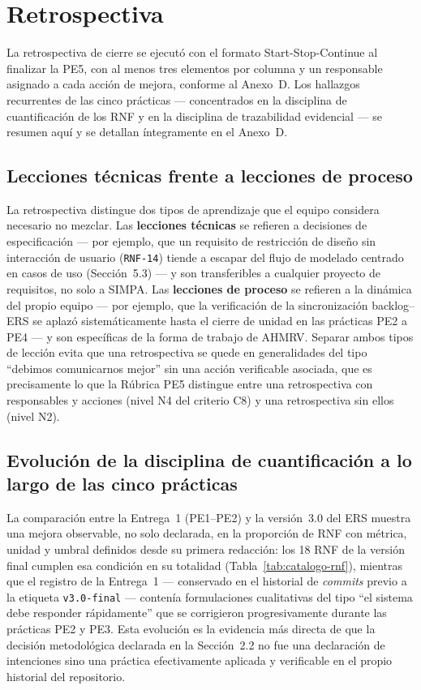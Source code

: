 \documentclass[11pt,a4paper]{article}
\newcommand{\id}[1]{\texttt{#1}}
\begin{document}
\section{Retrospectiva}

La retrospectiva de cierre se ejecutó con el formato Start-Stop-Continue al finalizar la PE5, con
al menos tres elementos por columna y un responsable asignado a cada acción de mejora, conforme al
Anexo~D. Los hallazgos recurrentes de las cinco prácticas --- concentrados en la disciplina de
cuantificación de los RNF y en la disciplina de trazabilidad evidencial --- se resumen aquí y se
detallan íntegramente en el Anexo~D.

\subsection{Lecciones técnicas frente a lecciones de proceso}

La retrospectiva distingue dos tipos de aprendizaje que el equipo considera necesario no mezclar.
Las \textbf{lecciones técnicas} se refieren a decisiones de especificación --- por ejemplo, que un
requisito de restricción de diseño sin interacción de usuario (\id{RNF-14}) tiende a escapar del
flujo de modelado centrado en casos de uso (Sección~5.3) --- y son transferibles a cualquier
proyecto de requisitos, no solo a SIMPA. Las \textbf{lecciones de proceso} se refieren a la
dinámica del propio equipo --- por ejemplo, que la verificación de la sincronización backlog--ERS
se aplazó sistemáticamente hasta el cierre de unidad en las prácticas PE2 a PE4 --- y son
específicas de la forma de trabajo de AHMRV. Separar ambos tipos de lección evita que una
retrospectiva se quede en generalidades del tipo ``debimos comunicarnos mejor'' sin una acción
verificable asociada, que es precisamente lo que la Rúbrica PE5 distingue entre una retrospectiva
con responsables y acciones (nivel N4 del criterio C8) y una retrospectiva sin ellos (nivel N2).

\subsection{Evolución de la disciplina de cuantificación a lo largo de las cinco prácticas}

La comparación entre la Entrega~1 (PE1--PE2) y la versión~3.0 del ERS muestra una mejora
observable, no solo declarada, en la proporción de RNF con métrica, unidad y umbral definidos desde
su primera redacción: los 18 RNF de la versión final cumplen esa condición en su totalidad
(Tabla~\ref{tab:catalogo-rnf}), mientras que el registro de la Entrega~1 --- conservado en el
historial de \emph{commits} previo a la etiqueta \id{v3.0-final} --- contenía formulaciones
cualitativas del tipo ``el sistema debe responder rápidamente'' que se corrigieron progresivamente
durante las prácticas PE2 y PE3. Esta evolución es la evidencia más directa de que la decisión
metodológica declarada en la Sección~2.2 no fue una declaración de intenciones sino una práctica
efectivamente aplicada y verificable en el propio historial del repositorio.
\end{document}
